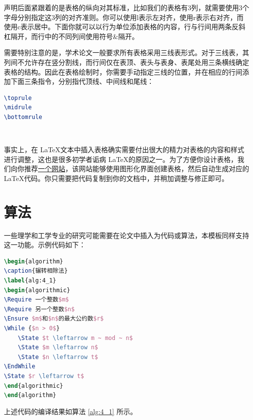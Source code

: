 声明后面紧跟着的是表格的纵向对其标准，比如我们的表格有3列，就需要使用3个字母分别指定这3列的对齐准则。你可以使用{\codefont l}表示左对齐，使用{\codefont r}表示右对齐，而使用{\codefont c}表示居中。下面你就可以以行为单位添加表格的内容，行与行间用两条反斜杠隔开，而行中的不同列间使用符号\&隔开。

需要特别注意的是，学术论文一般要求所有表格采用三线表形式。对于三线表，其列间不允许存在竖分割线，而行间仅在表顶、表头与表身、表尾处用三条横线确定表格的结构。因此在表格绘制时，你需要手动指定三线的位置，并在相应的行间添加下面三条指令，分别指代顶线、中间线和尾线：

\begin{tcolorbox}
\begin{lstlisting}[language=TeX]
\toprule
\midrule
\bottomrule
\end{lstlisting}
\end{tcolorbox}

~

事实上，在 \LaTeX 文本中插入表格确实需要付出很大的精力对表格的内容和样式进行调整，这也是很多初学者诟病 \LaTeX 的原因之一。为了方便你设计表格，我们向你推荐\href{http://www.tablesgenerator.com/}{一个网站}，该网站能够使用图形化界面创建表格，然后自动生成对应的 \LaTeX 代码。你只需要把代码复制到你的文档中，并稍加调整与修正即可。

\section{算法}

一些理学和工学专业的研究可能需要在论文中插入为代码或算法，本模板同样支持这一功能。示例代码如下：

\begin{tcolorbox}
\begin{lstlisting}[language=TeX]
\begin{algorithm}
\caption{辗转相除法}
\label{alg:4_1}
\begin{algorithmic}
\Require 一个整数$m$
\Require 另一个整数$n$
\Ensure $m$和$n$的最大公约数$r$
\While {$n > 0$}
    \State $t \leftarrow m ~ mod ~ n$
    \State $m \leftarrow n$
    \State $n \leftarrow t$
\EndWhile
\State $r \leftarrow t$
\end{algorithmic}
\end{algorithm}
\end{lstlisting}
\end{tcolorbox}

\noindent 上述代码的编译结果如算法 \ref{alg:4_1} 所示。

